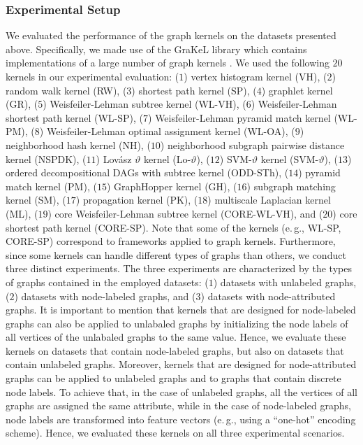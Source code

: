 \documentclass[twoside,11pt]{article}
\newcommand{\eg}{e.\,g., }
\begin{document}
\subsubsection{Experimental Setup}
We evaluated the performance of the graph kernels on the datasets presented above. 
Specifically, we made use of the GraKeL library which contains implementations of a large number of graph kernels .
We used the following $20$ kernels in our experimental evaluation: ($1$) vertex histogram kernel (VH), ($2$) random walk kernel (RW), ($3$) shortest path kernel (SP), ($4$) graphlet kernel (GR), ($5$) Weisfeiler-Lehman subtree kernel (WL-VH), ($6$) Weisfeiler-Lehman shortest path kernel (WL-SP), ($7$) Weisfeiler-Lehman pyramid match kernel (WL-PM), ($8$) Weisfeiler-Lehman optimal assignment kernel (WL-OA), ($9$) neighborhood hash kernel (NH), ($10$) neighborhood subgraph pairwise distance kernel (NSPDK), ($11$) Lov\'asz $\vartheta$ kernel (Lo-$\vartheta$), ($12$) SVM-$\vartheta$ kernel (SVM-$\vartheta$), ($13$) ordered decompositional DAGs with subtree kernel (ODD-STh), ($14$) pyramid match kernel (PM), ($15$) GraphHopper kernel (GH), ($16$) subgraph matching kernel (SM), ($17$) propagation kernel (PK), ($18$) multiscale Laplacian kernel (ML), ($19$) core Weisfeiler-Lehman subtree kernel (CORE-WL-VH), and ($20$) core shortest path kernel (CORE-SP).
Note that some of the kernels (\eg WL-SP, CORE-SP) correspond to frameworks applied to graph kernels.
Furthermore, since some kernels can handle different types of graphs than others, we conduct three distinct experiments.
The three experiments are characterized by the types of graphs contained in the employed datasets: ($1$) datasets with unlabeled graphs, ($2$) datasets with node-labeled graphs, and ($3$) datasets with node-attributed graphs.
It is important to mention that kernels that are designed for node-labeled graphs can also be applied to unlabaled graphs by initializing the node labels of all vertices of the unlabaled graphs to the same value.
Hence, we evaluate these kernels on datasets that contain node-labeled graphs, but also on datasets that contain unlabeled graphs.
Moreover, kernels that are designed for node-attributed graphs can be applied to unlabeled graphs and to graphs that contain discrete node labels.
To achieve that, in the case of unlabeled graphs, all the vertices of all graphs are assigned the same attribute, while in the case of node-labeled graphs, node labels are transformed into feature vectors (\eg using a ``one-hot'' encoding scheme).
Hence, we evaluated these kernels on all three experimental scenarios.
\end{document}
